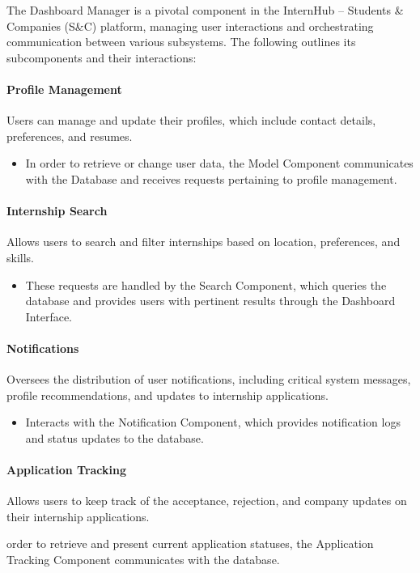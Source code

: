 The Dashboard Manager is a pivotal component in the InternHub – Students \& Companies (S\&C) platform, managing user interactions and orchestrating communication between various subsystems. The following outlines its subcomponents and their interactions:

\paragraph{Profile Management}
Users can manage and update their profiles, which include contact details, preferences, and resumes.
\begin{itemize}
    \item In order to retrieve or change user data, the Model Component communicates with the Database and receives requests pertaining to profile management.
\end{itemize}

\paragraph{Internship Search}
Allows users to search and filter internships based on location, preferences, and skills.
\begin{itemize}
    \item These requests are handled by the Search Component, which queries the database and provides users with pertinent results through the Dashboard Interface.
\end{itemize}

\paragraph{Notifications}
Oversees the distribution of user notifications, including critical system messages, profile recommendations, and updates to internship applications.
\begin{itemize}
    \item Interacts with the Notification Component, which provides notification logs and status updates to the database.
\end{itemize}

\paragraph{Application Tracking}
Allows users to keep track of the acceptance, rejection, and company updates on their internship applications.
\begin{itemize}
    \itemIn order to retrieve and present current application statuses, the Application Tracking Component communicates with the database.
\end{itemize}

